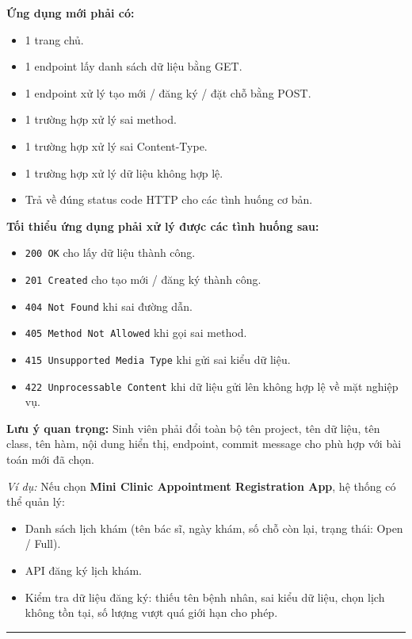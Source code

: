 \documentclass[12pt,a4paper]{article}
\begin{document}
\textbf{Ứng dụng mới phải có:}
\begin{itemize}[noitemsep]
    \item 1 trang chủ.
    \item 1 endpoint lấy danh sách dữ liệu bằng GET.
    \item 1 endpoint xử lý tạo mới / đăng ký / đặt chỗ bằng POST.
    \item 1 trường hợp xử lý sai method.
    \item 1 trường hợp xử lý sai Content-Type.
    \item 1 trường hợp xử lý dữ liệu không hợp lệ.
    \item Trả về đúng status code HTTP cho các tình huống cơ bản.
\end{itemize}

\textbf{Tối thiểu ứng dụng phải xử lý được các tình huống sau:}
\begin{itemize}[noitemsep]
    \item \texttt{200 OK} cho lấy dữ liệu thành công.
    \item \texttt{201 Created} cho tạo mới / đăng ký thành công.
    \item \texttt{404 Not Found} khi sai đường dẫn.
    \item \texttt{405 Method Not Allowed} khi gọi sai method.
    \item \texttt{415 Unsupported Media Type} khi gửi sai kiểu dữ liệu.
    \item \texttt{422 Unprocessable Content} khi dữ liệu gửi lên không hợp lệ về mặt nghiệp vụ.
\end{itemize}

\textbf{Lưu ý quan trọng:} Sinh viên phải đổi toàn bộ tên project, tên dữ liệu, tên class, tên hàm, nội dung hiển thị, endpoint, commit message cho phù hợp với bài toán mới đã chọn.

\textit{Ví dụ:} Nếu chọn \textbf{Mini Clinic Appointment Registration App}, hệ thống có thể quản lý:
\begin{itemize}[noitemsep]
    \item Danh sách lịch khám (tên bác sĩ, ngày khám, số chỗ còn lại, trạng thái: Open / Full).
    \item API đăng ký lịch khám.
    \item Kiểm tra dữ liệu đăng ký: thiếu tên bệnh nhân, sai kiểu dữ liệu, chọn lịch không tồn tại, số lượng vượt quá giới hạn cho phép.
\end{itemize}

\vspace{5mm}
\hrule
\vspace{5mm}
\end{document}
